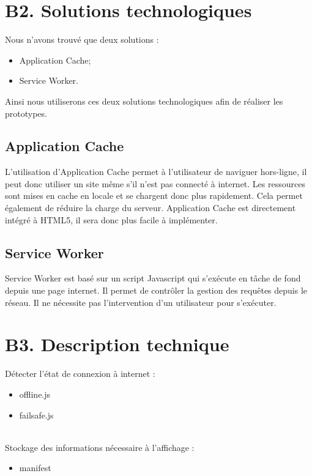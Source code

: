 \section{B2. Solutions technologiques}

	Nous n'avons trouvé que deux solutions : 
	\begin{itemize}
		\item Application Cache;
		\item Service Worker.
	\end{itemize}

	Ainsi nous utiliserons ces deux solutions technologiques afin de réaliser les prototypes.

	\subsection{Application Cache}
		L'utilisation d'Application Cache permet à l'utilisateur de naviguer hors-ligne, il peut donc utiliser un site même s'il n'est pas connecté à internet. Les ressources sont mises en cache en locale et se chargent donc plus rapidement. Cela permet également de réduire la charge du serveur. Application Cache est directement intégré à HTML5, il sera donc plus facile à implémenter.

	\subsection{Service Worker}
		Service Worker est basé sur un script Javascript qui s'exécute en tâche de fond depuis une page internet. Il permet de contrôler la gestion des requêtes depuis le réseau. Il ne nécessite pas l'intervention d'un utilisateur pour s'exécuter.

\section{B3. Description technique}

	Détecter l'état de connexion à internet :
	\begin{itemize}
		\item offline.js
		\item failsafe.js
	\end{itemize}
	~\\

	Stockage des informations nécessaire à l’affichage :
	\begin{itemize}
		\item manifest
	\end{itemize}
	~\\
	
